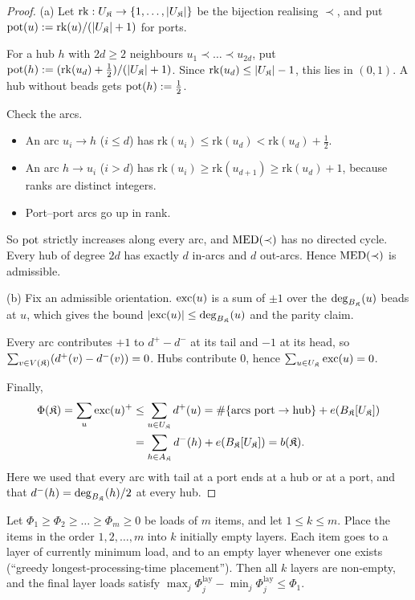 \begin{proof}
(a) Let $\mathrm{rk}:U_{\mathfrak{K}}\to\{1,\dots,|U_{\mathfrak{K}}|\}$ be the bijection realising $\prec$, and put $\mathrm{pot}(u):=\mathrm{rk}(u)/(|U_{\mathfrak{K}}|+1)$ for ports.

For a hub $h$ with $2d\ge2$ neighbours $u_1\prec\dots\prec u_{2d}$, put $\mathrm{pot}(h):=(\mathrm{rk}(u_d)+\tfrac12)/(|U_{\mathfrak{K}}|+1)$. Since $\mathrm{rk}(u_d)\le|U_{\mathfrak{K}}|-1$, this lies in $(0,1)$. A hub without beads gets $\mathrm{pot}(h):=\tfrac12$.

Check the arcs.
\begin{itemize}
\item An arc $u_i\to h$ ($i\le d$) has $\mathrm{rk}(u_i)\le\mathrm{rk}(u_d)<\mathrm{rk}(u_d)+\tfrac12$.
\item An arc $h\to u_i$ ($i>d$) has $\mathrm{rk}(u_i)\ge\mathrm{rk}(u_{d+1})\ge\mathrm{rk}(u_d)+1$, because ranks are distinct integers.
\item Port--port arcs go up in rank.
\end{itemize}
So $\mathrm{pot}$ strictly increases along every arc, and $\mathrm{MED}(\prec)$ has no directed cycle. Every hub of degree $2d$ has exactly $d$ in-arcs and $d$ out-arcs. Hence $\mathrm{MED}(\prec)$ is admissible.

(b) Fix an admissible orientation. $\mathrm{exc}(u)$ is a sum of $\pm1$ over the $\deg_{B_{\mathfrak{K}}}(u)$ beads at $u$, which gives the bound $|\mathrm{exc}(u)|\le\deg_{B_{\mathfrak{K}}}(u)$ and the parity claim.

Every arc contributes $+1$ to $d^+-d^-$ at its tail and $-1$ at its head, so $\sum_{v\in V(\mathfrak{K})}(d^+(v)-d^-(v))=0$. Hubs contribute $0$, hence $\sum_{u\in U_{\mathfrak{K}}}\mathrm{exc}(u)=0$.

Finally,
\begin{align*}
\Phi(\mathfrak{K})=\sum_u\mathrm{exc}(u)^+&\le\sum_{u\in U_{\mathfrak{K}}}d^+(u)=\#\{\text{arcs port}\to\text{hub}\}+e(B_{\mathfrak{K}}[U_{\mathfrak{K}}])\\
&=\sum_{h\in A_{\mathfrak{K}}}d^-(h)+e(B_{\mathfrak{K}}[U_{\mathfrak{K}}])=b(\mathfrak{K}).
\end{align*}
Here we used that every arc with tail at a port ends at a hub or at a port, and that $d^-(h)=\deg_{B_{\mathfrak{K}}}(h)/2$ at every hub.
\end{proof}

\begin{lemma}\label{s6:lemEQLPT}
Let $\Phi_1\ge\Phi_2\ge\dots\ge\Phi_m\ge0$ be loads of $m$ items, and let $1\le k\le m$. Place the items in the order $1,2,\dots,m$ into $k$ initially empty layers. Each item goes to a layer of currently minimum load, and to an empty layer whenever one exists (``greedy longest-processing-time placement''). Then all $k$ layers are non-empty, and the final layer loads satisfy $\max_j\Phi^{\mathrm{lay}}_j-\min_j\Phi^{\mathrm{lay}}_j\le\Phi_1$.
\end{lemma}

